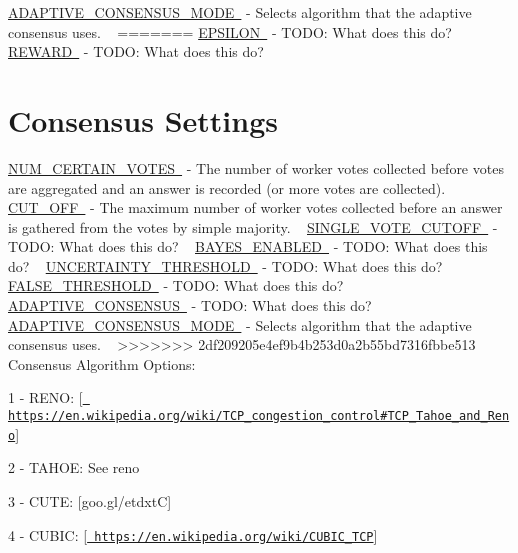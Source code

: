  \mbox{\hyperlink{namespacedynamicfilterapp_1_1toggles_a394fa3f8531c2ecc987f982367a4af2d}{A\+D\+A\+P\+T\+I\+V\+E\+\_\+\+C\+O\+N\+S\+E\+N\+S\+U\+S\+\_\+\+M\+O\+DE }} -\/ Selects algorithm that the adaptive consensus uses. ~\newline
=======
\mbox{\hyperlink{}{E\+P\+S\+I\+L\+ON }} -\/ T\+O\+DO\+: What does this do? ~\newline
 \mbox{\hyperlink{}{R\+E\+W\+A\+RD }} -\/ T\+O\+DO\+: What does this do? ~\newline
 \hypertarget{toggles_voteGetting}{}\section{Consensus Settings}\label{toggles_voteGetting}
\mbox{\hyperlink{}{N\+U\+M\+\_\+\+C\+E\+R\+T\+A\+I\+N\+\_\+\+V\+O\+T\+ES }} -\/ The number of worker votes collected before votes are aggregated and an answer is recorded (or more votes are collected). ~\newline
 \mbox{\hyperlink{}{C\+U\+T\+\_\+\+O\+FF }} -\/ The maximum number of worker votes collected before an answer is gathered from the votes by simple majority. ~\newline
 \mbox{\hyperlink{}{S\+I\+N\+G\+L\+E\+\_\+\+V\+O\+T\+E\+\_\+\+C\+U\+T\+O\+FF }} -\/ T\+O\+DO\+: What does this do? ~\newline
 \mbox{\hyperlink{}{B\+A\+Y\+E\+S\+\_\+\+E\+N\+A\+B\+L\+ED }} -\/ T\+O\+DO\+: What does this do? ~\newline
 \mbox{\hyperlink{}{U\+N\+C\+E\+R\+T\+A\+I\+N\+T\+Y\+\_\+\+T\+H\+R\+E\+S\+H\+O\+LD }} -\/ T\+O\+DO\+: What does this do? ~\newline
 \mbox{\hyperlink{}{F\+A\+L\+S\+E\+\_\+\+T\+H\+R\+E\+S\+H\+O\+LD }} -\/ T\+O\+DO\+: What does this do? ~\newline
 \mbox{\hyperlink{}{A\+D\+A\+P\+T\+I\+V\+E\+\_\+\+C\+O\+N\+S\+E\+N\+S\+US }} -\/ T\+O\+DO\+: What does this do? ~\newline
 \mbox{\hyperlink{}{A\+D\+A\+P\+T\+I\+V\+E\+\_\+\+C\+O\+N\+S\+E\+N\+S\+U\+S\+\_\+\+M\+O\+DE }} -\/ Selects algorithm that the adaptive consensus uses. ~\newline
>>>>>>> 2df209205e4ef9b4b253d0a2b55bd7316fbbe513
 Consensus Algorithm Options\+: ~\newline

\begin{DoxyItemize}
\item 1 -\/ R\+E\+NO\+: \mbox{[}\href{https://en.wikipedia.org/wiki/TCP_congestion_control\#TCP_Tahoe_and_Reno}{\texttt{ https\+://en.\+wikipedia.\+org/wiki/\+T\+C\+P\+\_\+congestion\+\_\+control\#\+T\+C\+P\+\_\+\+Tahoe\+\_\+and\+\_\+\+Reno}}\mbox{]}
\item 2 -\/ T\+A\+H\+OE\+: See reno
\item 3 -\/ C\+U\+TE\+: \mbox{[}goo.\+gl/etdxtC\mbox{]}
\item 4 -\/ C\+U\+B\+IC\+: \mbox{[}\href{https://en.wikipedia.org/wiki/CUBIC_TCP}{\texttt{ https\+://en.\+wikipedia.\+org/wiki/\+C\+U\+B\+I\+C\+\_\+\+T\+CP}}\mbox{]}
\end{DoxyItemize}

